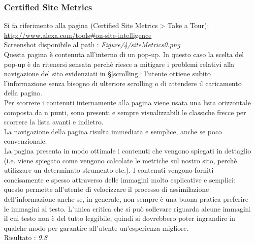 \subsubsection{Certified Site Metrics}\label{metrics}
Si fa riferimento alla pagina (Certified Site Metrics > Take a Tour): \\
\url{http://www.alexa.com/tools#on-site-intelligence}
\\
Screenshot disponibile al path : \textit{Figure/4/siteMetrics0.png} \\ 
Questa pagina è contenuta all'interno di un pop-up.
In questo caso la scelta del pop-up è da ritenersi sensata perchè riesce a 
mitigare i problemi relativi alla navigazione del sito evidenziati in 
§\ref{scrolling}: l'utente ottiene subito l'informazione senza
bisogno di ulteriore scrolling o di attendere il caricamento della pagina.\\
Per scorrere i contenuti internamente alla pagina viene usata una lista
 orizzontale composta da n punti, sono presenti e sempre
visualizzabili le classiche frecce per scorrere la lista avanti e indietro. \\
La navigazione della pagina risulta immediata e semplice, anche se poco
convenzionale. \\
La pagina presenta in modo ottimale i contenuti che vengono spiegati in 
dettaglio (i.e. viene spiegato come vengono calcolate le metriche sul
nostro sito, perchè utilizzare un determinato strumento etc.). I contenuti vengono
forniti concisamente e spesso attraverso delle immagini molto esplicative e
semplici: questo permette all'utente di velocizzare il processo di assimilazione
dell'informazione anche se, in generale, non sempre è una buona pratica 
preferire le immagini al testo. L'unica critica che si può sollevare riguarda
alcune immagini il cui testo non è del tutto leggibile, quindi si dovrebbero
poter ingrandire in qualche modo per garantire all'utente un'esperienza migliore.
 \\
Risultato : \textit{9.8}